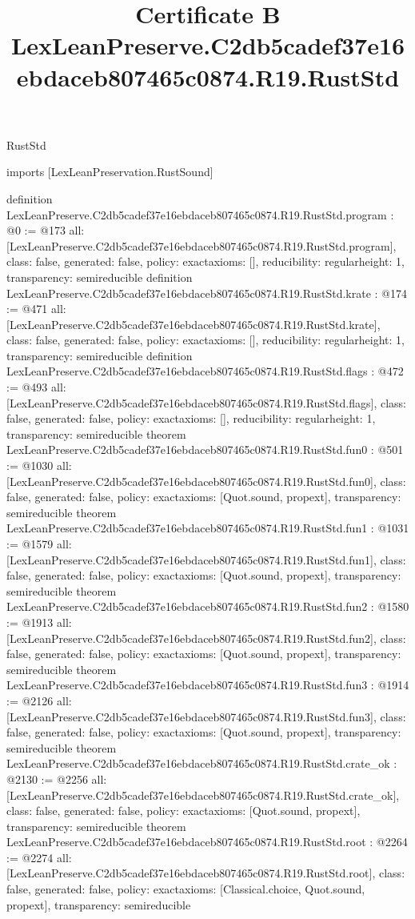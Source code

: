 \begin{lexlean}{RustStd}
\title{Certificate B LexLeanPreserve.C2db5cadef37e16ebdaceb807465c0874.R19.RustStd}
\begin{coremodule}
imports [LexLeanPreservation.RustSound]

definition LexLeanPreserve.C2db5cadef37e16ebdaceb807465c0874.R19.RustStd.program : @0 := @173 {
  all: [LexLeanPreserve.C2db5cadef37e16ebdaceb807465c0874.R19.RustStd.program],
  class: false,
  generated: false,
  policy: exact{axioms: []},
  reducibility: regular{height: 1},
  transparency: semireducible
}
definition LexLeanPreserve.C2db5cadef37e16ebdaceb807465c0874.R19.RustStd.krate : @174 := @471 {
  all: [LexLeanPreserve.C2db5cadef37e16ebdaceb807465c0874.R19.RustStd.krate],
  class: false,
  generated: false,
  policy: exact{axioms: []},
  reducibility: regular{height: 1},
  transparency: semireducible
}
definition LexLeanPreserve.C2db5cadef37e16ebdaceb807465c0874.R19.RustStd.flags : @472 := @493 {
  all: [LexLeanPreserve.C2db5cadef37e16ebdaceb807465c0874.R19.RustStd.flags],
  class: false,
  generated: false,
  policy: exact{axioms: []},
  reducibility: regular{height: 1},
  transparency: semireducible
}
theorem LexLeanPreserve.C2db5cadef37e16ebdaceb807465c0874.R19.RustStd.fun0 : @501 := @1030 {
  all: [LexLeanPreserve.C2db5cadef37e16ebdaceb807465c0874.R19.RustStd.fun0],
  class: false,
  generated: false,
  policy: exact{axioms: [Quot.sound, propext]},
  transparency: semireducible
}
theorem LexLeanPreserve.C2db5cadef37e16ebdaceb807465c0874.R19.RustStd.fun1 : @1031 := @1579 {
  all: [LexLeanPreserve.C2db5cadef37e16ebdaceb807465c0874.R19.RustStd.fun1],
  class: false,
  generated: false,
  policy: exact{axioms: [Quot.sound, propext]},
  transparency: semireducible
}
theorem LexLeanPreserve.C2db5cadef37e16ebdaceb807465c0874.R19.RustStd.fun2 : @1580 := @1913 {
  all: [LexLeanPreserve.C2db5cadef37e16ebdaceb807465c0874.R19.RustStd.fun2],
  class: false,
  generated: false,
  policy: exact{axioms: [Quot.sound, propext]},
  transparency: semireducible
}
theorem LexLeanPreserve.C2db5cadef37e16ebdaceb807465c0874.R19.RustStd.fun3 : @1914 := @2126 {
  all: [LexLeanPreserve.C2db5cadef37e16ebdaceb807465c0874.R19.RustStd.fun3],
  class: false,
  generated: false,
  policy: exact{axioms: [Quot.sound, propext]},
  transparency: semireducible
}
theorem LexLeanPreserve.C2db5cadef37e16ebdaceb807465c0874.R19.RustStd.crate_ok : @2130 := @2256 {
  all: [LexLeanPreserve.C2db5cadef37e16ebdaceb807465c0874.R19.RustStd.crate_ok],
  class: false,
  generated: false,
  policy: exact{axioms: [Quot.sound, propext]},
  transparency: semireducible
}
theorem LexLeanPreserve.C2db5cadef37e16ebdaceb807465c0874.R19.RustStd.root : @2264 := @2274 {
  all: [LexLeanPreserve.C2db5cadef37e16ebdaceb807465c0874.R19.RustStd.root],
  class: false,
  generated: false,
  policy: exact{axioms: [Classical.choice, Quot.sound, propext]},
  transparency: semireducible
}


\end{coremodule}
\end{lexlean}

